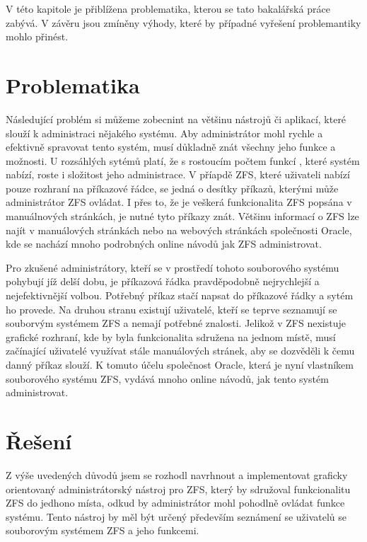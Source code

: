 V této kapitole je přiblížena problematika, kterou se tato bakalářská práce zabývá. V závěru jsou zmíněny výhody, které by případné vyřešení problemantiky mohlo přinést.

\section{Problematika}
Následující problém si můžeme zobecnint na většinu nástrojů či aplikací, které slouží k administraci nějakého systému.
Aby administrátor mohl rychle a efektivně spravovat tento systém, musí důkladně znát všechny jeho funkce a možnosti. U rozsáhlých sytémů platí, že s rostoucím počtem funkcí , které systém nabízí, roste i složitost jeho administrace. V příapdě ZFS, které uživateli nabízí pouze rozhraní na příkazové řádce, se jedná o desítky příkazů, kterými může administrátor ZFS ovládat. I přes to, že je veškerá funkcionalita ZFS popsána v manuálnových stránkách, je nutné tyto příkazy znát. 
Většinu informací o ZFS lze najít v manuálových stránkách nebo na webových stránkách společnosti Oracle, kde se nachází mnoho
podrobných online návodů jak ZFS administrovat.

Pro zkušené administrátory, kteří se v prostředí tohoto souborového systému pohybují jíž delší dobu, je příkazová řádka pravděpodobně nejrychlejší a nejefektivnější volbou. Potřebný příkaz stačí napsat do příkazové řádky a sytém ho provede. Na druhou stranu existují uživatelé, kteří se teprve seznamují se souborvým systémem ZFS a nemají potřebné znalosti. Jelikož v ZFS nexistuje grafické rozhraní, kde by byla funkcionalita sdružena na jednom místě, musí začínající uživatelé využívat stále manuálových stránek, aby se dozvěděli k čemu danný příkaz slouží. K tomuto účelu společnost Oracle, která je nyní vlastníkem souborového systému ZFS, vydává mnoho online návodů, jak tento systém administrovat. 
\section{Řešení}
Z výše uvedených důvodů jsem se rozhodl navrhnout a implementovat graficky orientovaný administrátorský nástroj pro ZFS,
který by sdružoval funkcionalitu ZFS do jedhono místa, odkud by administrátor mohl pohodlně ovládat funkce systému. Tento nástroj by měl být určený především seznámení se uživatelů se souborovým systémem ZFS a jeho funkcemi.
